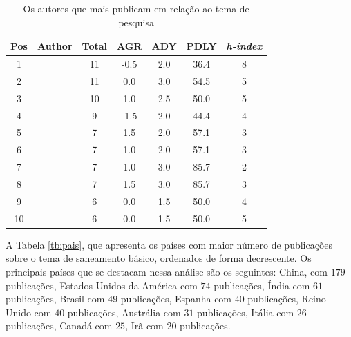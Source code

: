 \begin{table}[b]
	\centering
	\caption{Os autores que mais publicam em relação ao tema de pesquisa}\label{tb:autor}
	\begin{tabular}{ccccccc}
		\hline
		Pos & Author       & Total & AGR  & ADY  & PDLY & \textit{h-index} \\
		\hline
		1 & \citeonline{2-s2.0-84973369468} & 11 & -0.5 & 2.0 & 36.4 & 8 \\
		2 & \citeonline{2-s2.0-85123707840} & 11 & 0.0 & 3.0 & 54.5 & 5 \\
		3 & \citeonline{2-s2.0-85018469706} & 10 & 1.0 & 2.5 & 50.0 & 5 \\
		4 & \citeonline{2-s2.0-85048003524} & 9 & -1.5 & 2.0 & 44.4 & 4 \\
		5 & \citeonline{2-s2.0-84964575877} & 7 & 1.5 & 2.0 & 57.1 & 3 \\
		6 & \citeonline{2-s2.0-85063200888} & 7 & 1.0 & 2.0 & 57.1 & 3 \\
		7 & \citeonline{2-s2.0-85148656225} & 7 & 1.0 & 3.0 & 85.7 & 2 \\
		8 & \citeonline{2-s2.0-85041536076} & 7 & 1.5 & 3.0 & 85.7 & 3 \\
		9 & \citeonline{2-s2.0-85130875471} & 6 & 0.0 & 1.5 & 50.0 & 4 \\
		10 & \citeonline{2-s2.0-85061810603}& 6 & 0.0 & 1.5 & 50.0 & 5 \\
		\hline
	\end{tabular}
	
	
\end{table}


A Tabela \ref{tb:pais}, que apresenta os países com maior número de publicações sobre o tema de saneamento básico, ordenados de forma decrescente. Os principais países que se destacam nessa análise são os seguintes: China, com $179$ publicações, Estados Unidos da América com $74$ publicações, Índia com $61$ publicações, Brasil com $49$ publicações, Espanha com $40$ publicações, Reino Unido com $40$ publicações, Austrália com $31$ publicações, Itália com $26$ publicações, Canadá com $25$, Irã com $20$ publicações.

